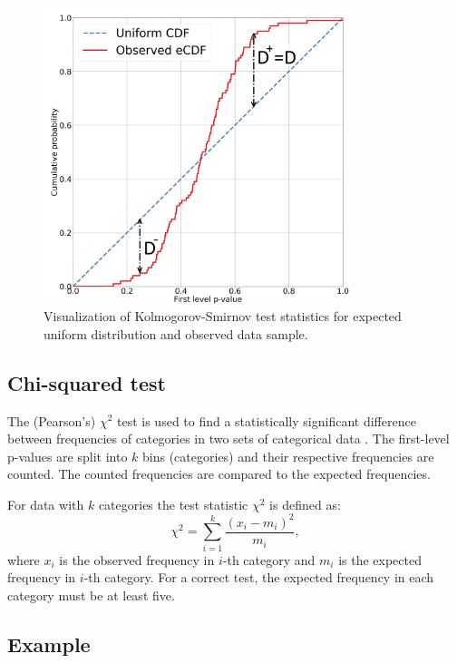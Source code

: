 \documentclass[
  digital,     %
  oneside,     %
  nosansbold,  %
  nocolorbold, %
  nolof,         %
  nolot,         %
]{fithesis4}
\begin{document}
\begin{figure}
  \begin{center}
    \includegraphics[width=9cm]{figures/ks_d.png}
  \end{center}
  \caption{Visualization of Kolmogorov-Smirnov test statistics for expected uniform distribution and observed data sample.}
  \label{fig:ks_d}
\end{figure}

\subsection{Chi-squared test}

The (Pearson's) $\chi^2$ test is used to find a statistically significant difference between frequencies of categories in two sets of categorical data \cite[p. 171]{stat-procedures}. The first-level p-values are split into $k$ bins (categories) and their respective frequencies are counted. The counted frequencies are compared to the expected frequencies.

For data with $k$ categories the test statistic $\chi^2$ is defined as:
\[\chi^2 = \sum_{i=1}^{k} \dfrac{(x_i - m_i)^2}{m_i}, \]
where $x_i$ is the observed frequency in $i$-th category and $m_i$ is the expected frequency in $i$-th category. %
For a correct test, the expected frequency in each category must be at least five.

\subsection{Example}
\end{document}
